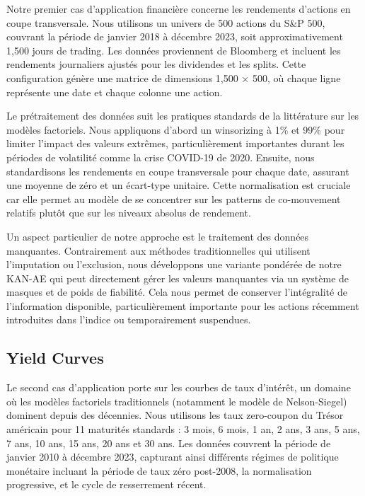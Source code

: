 Notre premier cas d'application financière concerne les rendements d'actions en coupe transversale. Nous utilisons un univers de 500 actions du S\&P 500, couvrant la période de janvier 2018 à décembre 2023, soit approximativement 1,500 jours de trading. Les données proviennent de Bloomberg et incluent les rendements journaliers ajustés pour les dividendes et les splits. Cette configuration génère une matrice de dimensions 1,500 × 500, où chaque ligne représente une date et chaque colonne une action.

Le prétraitement des données suit les pratiques standards de la littérature sur les modèles factoriels. Nous appliquons d'abord un winsorizing à 1\% et 99\% pour limiter l'impact des valeurs extrêmes, particulièrement importantes durant les périodes de volatilité comme la crise COVID-19 de 2020. Ensuite, nous standardisons les rendements en coupe transversale pour chaque date, assurant une moyenne de zéro et un écart-type unitaire. Cette normalisation est cruciale car elle permet au modèle de se concentrer sur les patterns de co-mouvement relatifs plutôt que sur les niveaux absolus de rendement.

Un aspect particulier de notre approche est le traitement des données manquantes. Contrairement aux méthodes traditionnelles qui utilisent l'imputation ou l'exclusion, nous développons une variante pondérée de notre KAN-AE qui peut directement gérer les valeurs manquantes via un système de masques et de poids de fiabilité. Cela nous permet de conserver l'intégralité de l'information disponible, particulièrement importante pour les actions récemment introduites dans l'indice ou temporairement suspendues.

\subsection{Yield Curves}

Le second cas d'application porte sur les courbes de taux d'intérêt, un domaine où les modèles factoriels traditionnels (notamment le modèle de Nelson-Siegel) dominent depuis des décennies. Nous utilisons les taux zero-coupon du Trésor américain pour 11 maturités standards : 3 mois, 6 mois, 1 an, 2 ans, 3 ans, 5 ans, 7 ans, 10 ans, 15 ans, 20 ans et 30 ans. Les données couvrent la période de janvier 2010 à décembre 2023, capturant ainsi différents régimes de politique monétaire incluant la période de taux zéro post-2008, la normalisation progressive, et le cycle de resserrement récent.

